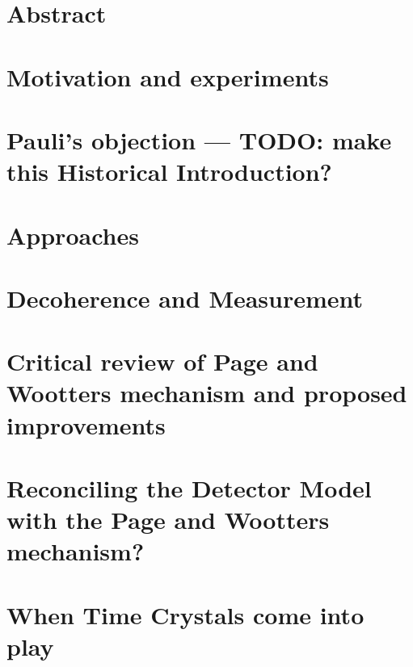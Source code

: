 



\maketitle

\tableofcontents

\chapter*{Abstract}


\chapter{Motivation and experiments}


\chapter{Pauli's objection --- TODO: make this Historical Introduction?}



\chapter{Approaches}


\chapter{Decoherence and Measurement}


\chapter{Critical review of Page and Wootters mechanism and proposed improvements}



\chapter{Reconciling the Detector Model with the Page and Wootters mechanism?}


\chapter{When Time Crystals come into play}


